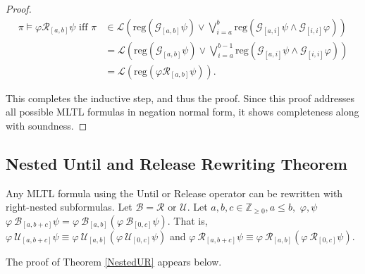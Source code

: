 \documentclass[runningheads]{llncs}
\renewcommand{\phi}{\varphi}
\begin{document}
\begin{proof}
  \begin{align*}
    \pi \vDash \varphi \mathcal{R}_{[a,b]} \psi \text{ iff } \pi &\in \mathscr{L}\left(\text{reg}(\mathcal{G}_{[a,b]} \psi) \lor \bigvee_{i=a}^{b} \text{reg}\left(\mathcal{G}_{[a,i]}\psi \land \mathcal{G}_{[i, i]} \phi\right)\right) \\
    &= \mathscr{L}\left(\text{reg}(\mathcal{G}_{[a,b]} \psi) \lor \bigvee_{i=a}^{b-1} \text{reg}\left(\mathcal{G}_{[a,i]}\psi \land \mathcal{G}_{[i, i]} \phi\right)\right)\\
    &= \mathscr{L}\left(\text{reg}(\varphi \mathcal{R}_{[a,b]} \psi)\right).
  \end{align*}
  
 \noindent This completes the inductive step, and thus the proof. Since this proof addresses all possible MLTL formulas in negation normal form, it shows completeness along with soundness.
 \end{proof}


\subsection{Nested Until and Release Rewriting Theorem} \label{Appendix-NestedUR}

 \begin{theorem} \label{NestedUR}
   Any MLTL formula using the Until or Release operator can be rewritten with right-nested subformulas. Let $\mathcal{B} = \mathcal{R} \text{ or } \mathcal{U}$. Let $a,b,c \in \mathbb{Z}_{\geq 0} , a \leq b,$  $ \phi,   \psi$  $ \phi \ \mathcal{B}_{[a,b+c]} \psi = \phi \ \mathcal{B}_{[a,b]}(\phi \ \mathcal{B}_{[0,c]} \psi)$. That is, $ \phi \ \mathcal{U}_{[a,b+c]} \psi \equiv \phi \ \mathcal{U}_{[a,b]}(\phi \ \mathcal{U}_{[0,c]} \psi)$ and $ \phi \ \mathcal{R}_{[a,b+c]} \psi \equiv \phi \ \mathcal{R}_{[a,b]}(\phi \ \mathcal{R}_{[0,c]} \psi)$.
\end{theorem}
The proof of Theorem \ref{NestedUR} appears below.


\end{document}
